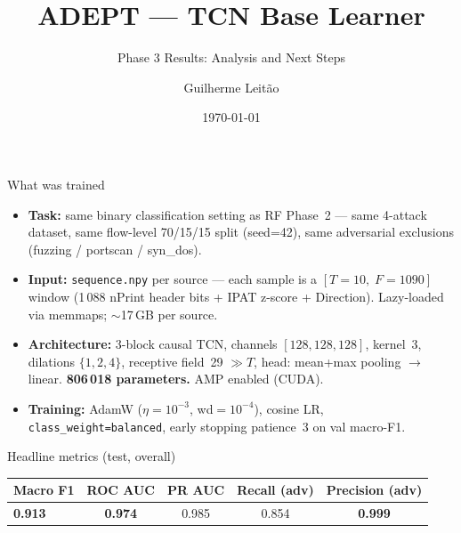 \documentclass[10pt,aspectratio=169]{beamer}
\title[ADEPT --- TCN Results]{ADEPT --- TCN Base Learner}
\subtitle{Phase 3 Results: Analysis and Next Steps}
\author{Guilherme Leit\~ao}
\institute[IST/INESC-ID]{Master Thesis --- IST / INESC-ID}
\date{\today}
\newcommand{\good}[1]{\textcolor{good}{\textbf{#1}}}
\newcommand{\warn}[1]{\textcolor{warn}{\textbf{#1}}}
\begin{document}
\begin{frame}
  \titlepage
\end{frame}

\begin{frame}{What was trained}
\begin{itemize}
  \item \textbf{Task:} same binary classification setting as RF Phase~2 ---
        same 4-attack dataset, same flow-level 70/15/15 split (seed=42),
        same adversarial exclusions (fuzzing / portscan / syn\_dos).
  \item \textbf{Input:} \texttt{sequence.npy} per source --- each sample is a
        $[T{=}10,\;F{=}1090]$ window (1\,088 nPrint header bits + IPAT z-score
        + Direction). Lazy-loaded via memmaps; $\sim$17\,GB per source.
  \item \textbf{Architecture:} 3-block causal TCN, channels $[128,128,128]$,
        kernel~3, dilations $\{1,2,4\}$, receptive field~29 $\gg T$,
        head: mean+max pooling $\to$ linear.
        \textbf{806\,018 parameters.} AMP enabled (CUDA).
  \item \textbf{Training:} AdamW ($\eta{=}10^{-3}$, wd$=10^{-4}$), cosine LR,
        \texttt{class\_weight=balanced}, early stopping patience~3 on
        val macro-F1.
\end{itemize}

\begin{block}{Headline metrics (test, overall)}
\centering
\begin{tabular}{lcccc}
\toprule
\textbf{Macro F1} & \textbf{ROC AUC} & \textbf{PR AUC} & \textbf{Recall (adv)} & \textbf{Precision (adv)} \\
\midrule
\warn{0.913} & \warn{0.974} & 0.985 & 0.854 & \good{0.999} \\
\bottomrule
\end{tabular}
\end{block}
\end{frame}
\end{document}
